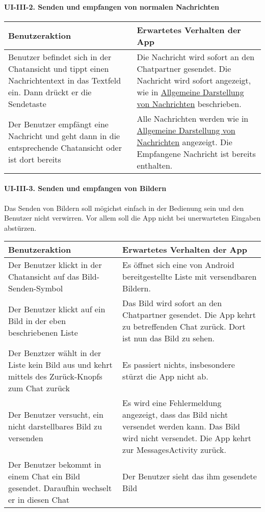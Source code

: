 \paragraph{UI-III-2. Senden und empfangen von normalen
Nachrichten}\label{senden-und-empfangen-von-normalen-nachrichten}

\begin{longtable}{|p{8cm}|p{8.5cm}|}
\hline
Benutzeraktion & Erwartetes Verhalten der App\tabularnewline
\hline

Benutzer befindet sich in der Chatansicht und tippt einen
Nachrichtentext in das Textfeld ein. Dann drückt er die Sendetaste & Die
Nachricht wird sofort an den Chatpartner gesendet. Die Nachricht wird
sofort angezeigt, wie in
\href{Manueller-Test-UI\#allgemeine-darstellung-der-nachrichten}{Allgemeine
Darstellung von Nachrichten} beschrieben.\tabularnewline
Der Benutzer empfängt eine Nachricht und geht dann in die entsprechende
Chatansicht oder ist dort bereits & Alle Nachrichten werden wie in
\href{Manueller-Test-UI\#allgemeine-darstellung-der-nachrichten}{Allgemeine
Darstellung von Nachrichten} angezeigt. Die Empfangene Nachricht ist
bereits enthalten.\tabularnewline
\hline
\end{longtable}

\paragraph{UI-III-3. Senden und empfangen von
Bildern}\label{senden-und-empfangen-von-bildern}

Das Senden von Bildern soll mögichst einfach in der Bedienung sein und
den Benutzer nicht verwirren. Vor allem soll die App nicht bei
unerwarteten Eingaben abstürzen.

\begin{longtable}{|p{8cm}|p{8.5cm}|}
\hline
Benutzeraktion & Erwartetes Verhalten der App\tabularnewline
\hline

Der Benutzer klickt in der Chatansicht auf das Bild-Senden-Symbol & Es
öffnet sich eine von Android bereitgestellte Liste mit versendbaren
Bildern.\tabularnewline
Der Benutzer klickt auf ein Bild in der eben beschriebenen Liste & Das
Bild wird sofort an den Chatpartner gesendet. Die App kehrt zu
betreffenden Chat zurück. Dort ist nun das Bild zu sehen.\tabularnewline
Der Benztzer wählt in der Liste kein Bild aus und kehrt mittels des
Zurück-Knopfs zum Chat zurück & Es passiert nichts, insbesondere stürzt
die App nicht ab.\tabularnewline
Der Benutzer versucht, ein nicht darstellbares Bild zu versenden & Es
wird eine Fehlermeldung angezeigt, dass das Bild nicht versendet werden
kann. Das Bild wird nicht versendet. Die App kehrt zur MessagesActivity
zurück.\tabularnewline
Der Benutzer bekommt in einem Chat ein Bild gesendet. Daraufhin wechselt
er in diesen Chat & Der Benutzer sieht das ihm gesendete
Bild\tabularnewline
\hline
\end{longtable}

